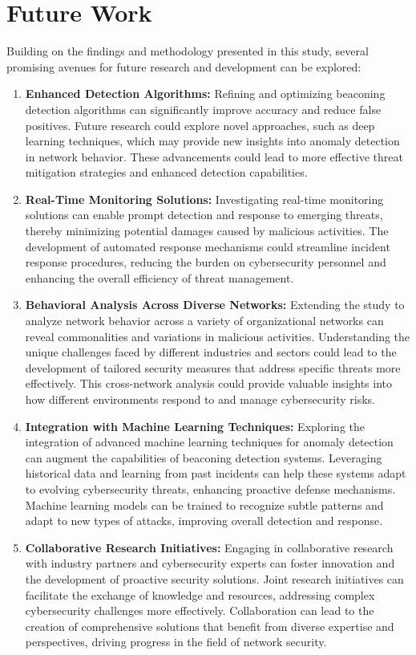 \section{Future Work}

Building on the findings and methodology presented in this study, several promising avenues for future research and development can be explored:

\begin{enumerate}
    \item \textbf{Enhanced Detection Algorithms:} Refining and optimizing beaconing detection algorithms can significantly improve accuracy and reduce false positives. Future research could explore novel approaches, such as deep learning techniques, which may provide new insights into anomaly detection in network behavior. These advancements could lead to more effective threat mitigation strategies and enhanced detection capabilities.

    \item \textbf{Real-Time Monitoring Solutions:} Investigating real-time monitoring solutions can enable prompt detection and response to emerging threats, thereby minimizing potential damages caused by malicious activities. The development of automated response mechanisms could streamline incident response procedures, reducing the burden on cybersecurity personnel and enhancing the overall efficiency of threat management.

    \item \textbf{Behavioral Analysis Across Diverse Networks:} Extending the study to analyze network behavior across a variety of organizational networks can reveal commonalities and variations in malicious activities. Understanding the unique challenges faced by different industries and sectors could lead to the development of tailored security measures that address specific threats more effectively. This cross-network analysis could provide valuable insights into how different environments respond to and manage cybersecurity risks.

    \item \textbf{Integration with Machine Learning Techniques:} Exploring the integration of advanced machine learning techniques for anomaly detection can augment the capabilities of beaconing detection systems. Leveraging historical data and learning from past incidents can help these systems adapt to evolving cybersecurity threats, enhancing proactive defense mechanisms. Machine learning models can be trained to recognize subtle patterns and adapt to new types of attacks, improving overall detection and response.

    \item \textbf{Collaborative Research Initiatives:} Engaging in collaborative research with industry partners and cybersecurity experts can foster innovation and the development of proactive security solutions. Joint research initiatives can facilitate the exchange of knowledge and resources, addressing complex cybersecurity challenges more effectively. Collaboration can lead to the creation of comprehensive solutions that benefit from diverse expertise and perspectives, driving progress in the field of network security.
\end{enumerate}

